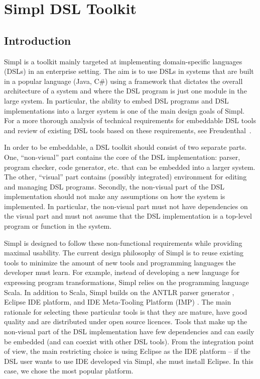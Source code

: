 \section{Simpl DSL Toolkit}


\subsection{Introduction}

Simpl is a toolkit mainly targeted at implementing domain-specific
languages (DSLs) in an enterprise setting. The aim is to use DSLs
in systems that are built in a popular language (Java, C\#) using
a framework that dictates the overall architecture of a system and
where the DSL program is just one module in the large system. In particular,
the ability to embed DSL programs and DSL implementations into a larger
system is one of the main design goals of Simpl. For a more thorough
analysis of technical requirements for embeddable DSL tools and review
of existing DSL tools based on these requirements, see Freudenthal~\cite{enterprise-dsl}.

In order to be embeddable, a DSL toolkit should consist of two separate
parts. One, ``non-visual'' part contains the core of the DSL implementation:
parser, program checker, code generator, etc. that can be embedded
into a larger system. The other, ``visual'' part contains (possibly
integrated) environment for editing and managing DSL programs. Secondly,
the non-visual part of the DSL implementation should not make any
assumptions on how the system is implemented. In particular, the non-visual
part must not have dependencies on the visual part and must not assume
that the DSL implementation is a top-level program or function in
the system.

Simpl is designed to follow these non-functional requirements while
providing maximal usability. The current design philosophy of Simpl
is to reuse existing tools to minimize the amount of new tools and
programming languages the developer must learn. For example, instead
of developing a new language for expressing program transformations,
Simpl relies on the programming language Scala. In addition to Scala,
Simpl builds on the ANTLR parser generator \cite{antlr}, Eclipse
IDE platform, and IDE Meta-Tooling Platform (IMP) \cite{imp}. The
main rationale for selecting these particular tools is that they are
mature, have good quality and are distributed under open source licences.
Tools that make up the non-visual part of the DSL implementation have
few dependencies and can easily be embedded (and can coexist with
other DSL tools). From the integration point of view, the main restricting
choice is using Eclipse as the IDE platform -- if the DSL user wants
to use IDE developed via Simpl, she must install Eclipse. In this
case, we chose the most popular platform.

